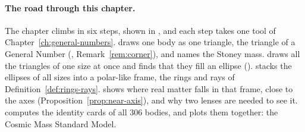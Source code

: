 \paragraph{The road through this chapter.}
The chapter climbs in six steps, shown in , and each step takes one tool of Chapter~\ref{ch:general-numbers}.  draws one body as one triangle, the triangle of a General Number (, Remark~\ref{rem:corner}), and names the Stoney mass.  draws all the triangles of one size at once and finds that they fill an ellipse ().  stacks the ellipses of all sizes into a polar-like frame, the rings and rays of Definition~\ref{def:rings-rays}.  shows where real matter falls in that frame, close to the axes (Proposition~\ref{prop:near-axis}), and why two lenses are needed to see it.  computes the identity cards of all 306 bodies, and  plots them together: the Cosmic Mass Standard Model.

